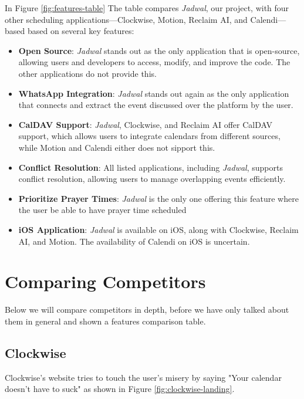 \documentclass[12pt,a4paper]{report}
\begin{document}
\newpage

In Figure \ref{fig:features-table} The table compares \textit{Jadwal}, our project, with four other scheduling applications—Clockwise, Motion, Reclaim AI, and Calendi—based based on several key features:
\begin{itemize}
    \item \textbf{Open Source}: \textit{Jadwal} stands out as the only application that is open-source, allowing users and developers to access, modify, and improve the code. The other applications do not provide this.
    \item \textbf{WhatsApp Integration}: \textit{Jadwal} stands out again as the only application that connects and extract the event discussed over the platform by the user.
    \item \textbf{CalDAV Support}: \textit{Jadwal}, Clockwise, and Reclaim AI offer CalDAV support, which allows users to integrate calendars from different sources, while Motion and Calendi either does not sipport this.
    \item \textbf{Conflict Resolution}: All listed applications, including \textit{Jadwal}, supports conflict resolution, allowing users to manage overlapping events efficiently.
    \item \textbf{Prioritize Prayer Times}: \textit{Jadwal} is the only one offering this feature where the user be able to have prayer time scheduled
    \item \textbf{iOS Application}: \textit{Jadwal} is available on iOS, along with Clockwise, Reclaim AI, and Motion. The availability of Calendi on iOS is uncertain.
\end{itemize}

\section{Comparing Competitors}

Below we will compare competitors in depth, before we have only talked about them in general and shown a features comparison table.

\subsection{Clockwise}

Clockwise's website tries to touch the user's misery by saying "Your calendar doesn't have to suck" as shown in Figure \ref{fig:clockwise-landing}.
\end{document}
